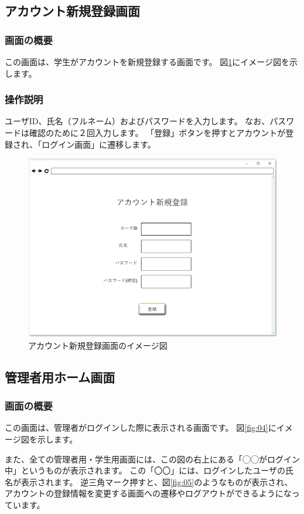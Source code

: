 \subsection{アカウント新規登録画面\label{creat_account}}
\subsubsection{画面の概要}
この画面は、学生がアカウントを新規登録する画面です。
図\ref{fig:03}にイメージ図を示します。

\subsubsection{操作説明}
ユーザID、氏名（フルネーム）およびパスワードを入力します。
なお、パスワードは確認のために２回入力します。
「登録」ボタンを押すとアカウントが登録され、「ログイン画面」に遷移します。

\begin{figure}[htbp]
  \begin{center}
    \includegraphics[width=0.6\linewidth,clip]{./img/03.png}
    \caption{アカウント新規登録画面のイメージ図}\label{fig:03}
  \end{center}
\end{figure}

\newpage

\subsection{管理者用ホーム画面}
\subsubsection{画面の概要}
この画面は、管理者がログインした際に表示される画面です。
図\ref{fig:04}にイメージ図を示します。

また、全ての管理者用・学生用画面には、この図の右上にある「◯◯がログイン中」というものが表示されます。
この「〇〇」には、ログインしたユーザの氏名が表示されます。
逆三角マーク押すと、図\ref{fig:05}のようなものが表示され、
アカウントの登録情報を変更する画面への遷移やログアウトができるようになっています。

